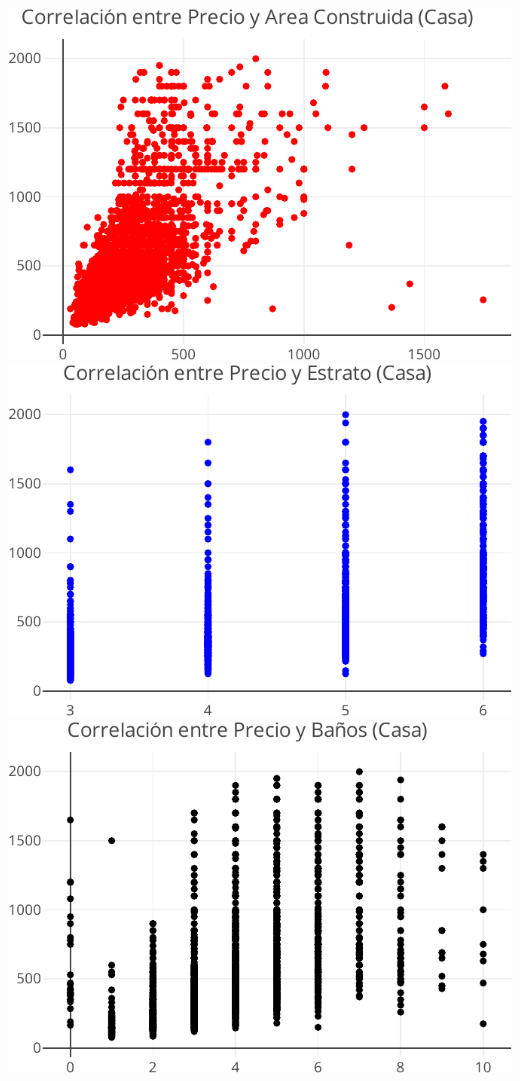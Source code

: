 \documentclass[
]{article}
\begin{document}
\includegraphics{A2_U2_InformeEjecutivo_files/figure-latex/unnamed-chunk-14-1.pdf}
\includegraphics{A2_U2_InformeEjecutivo_files/figure-latex/unnamed-chunk-14-2.pdf}
\includegraphics{A2_U2_InformeEjecutivo_files/figure-latex/unnamed-chunk-14-3.pdf}
\end{document}
